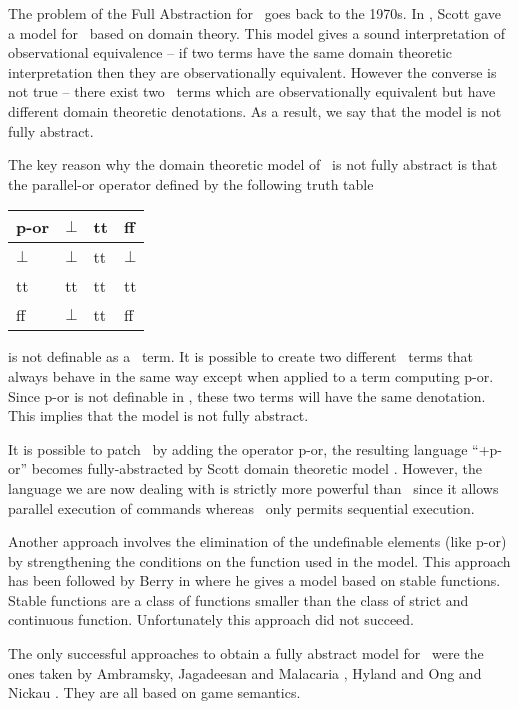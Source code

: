 The problem of the Full Abstraction for \pcf\ goes back to the
1970s. In \citep{scott93}, Scott gave a model for \pcf\ based on
domain theory. This model gives a sound interpretation of
observational equivalence -- if two terms have the same domain
theoretic interpretation then they are observationally equivalent.
However the converse is not true -- there exist two \pcf\ terms
which are observationally equivalent but have different domain
theoretic denotations. As a result, we say that the model is not
fully abstract.

The key reason why the domain theoretic model of \pcf\ is not fully
abstract is that the parallel-or operator defined by the following
truth table
\begin{center}
\begin{tabular}{l|lll}
p-or  & $\bot$ & tt & ff \\ \hline
$\bot$ & $\bot$ & tt & $\bot$\\
tt & tt & tt & tt\\
ff & $\bot$ & tt & ff\\
\end{tabular}
\end{center}
is not definable as a \pcf\ term. It is possible to create two
different \pcf\ terms that always behave in the same way except when
applied to a term computing p-or. Since p-or is not definable in
\pcf, these two terms will have the same denotation. This implies
that the model is not fully abstract.


It is possible to patch \pcf\ by adding the operator p-or, the
resulting language ``\pcf+p-or'' becomes fully-abstracted by Scott
domain theoretic model \citep{DBLP:journals/tcs/Plotkin77}. However,
the language we are now dealing with is strictly more powerful than
\pcf\ since it allows parallel execution of commands whereas \pcf\
only permits sequential execution.

Another approach involves the elimination of the undefinable
elements (like p-or) by strengthening the conditions on the function
used in the model. This approach has been followed by Berry in
\cite{berry-stable,gberry-thesis} where he gives a model based on
stable functions. Stable functions are a class of functions smaller
than the class of strict and continuous function. Unfortunately this
approach did not succeed.

The only successful approaches to obtain a fully abstract model for
\pcf\ were the ones taken by Ambramsky, Jagadeesan and Malacaria
\citep{abramsky94full}, Hyland and Ong \citep{hylandong_pcf} and
Nickau \citep{Nickau:lfcs94}. They are all based on game semantics.

